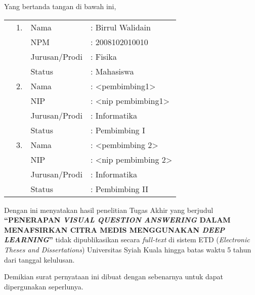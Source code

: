 \spernyataan %

\noindent
Yang bertanda tangan di bawah ini,
\vspace{-0.1cm}
\begin{table}[H]
{\renewcommand{\arraystretch}{0.7}
\begin{tabular}{M{0.6cm}lll}
	&1. 	& Nama   		&: Birrul Walidain \\
	&	& NPM       			&: 2008102010010   \\
	&	& Jurusan/Prodi   		&: Fisika \\
	&	& Status 				&: Mahasiswa \\  
	&2. 	& Nama  		&: <pembimbing1> \\
	&	& NIP       			&: <nip pembimbing1>   \\
	&	& Jurusan/Prodi   		&: Informatika \\
	&	& Status 				&: Pembimbing I \\  
	&3. 	& Nama  		&: <pembimbing 2> \\
	&	& NIP       			&: <nip pembimbing 2>   \\
	&	& Jurusan/Prodi   		&: Informatika \\
	&	& Status 				&: Pembimbing II   
\end{tabular}
}
\end{table}
\vspace{-0.4cm}
\noindent
Dengan ini menyatakan hasil penelitian Tugas Akhir yang berjudul \textbf{“PENERAPAN \textit{VISUAL QUESTION ANSWERING} DALAM MENAFSIRKAN CITRA MEDIS MENGGUNAKAN \textit{DEEP LEARNING}”} tidak dipublikasikan secara \textit{full-text} di sistem ETD (\textit{Electronic Theses and Dissertations}) Universitas Syiah Kuala hingga batas waktu 5 tahun dari tanggal kelulusan.

\vspace{0.4cm}
\noindent
Demikian surat pernyataan ini dibuat dengan sebenarnya untuk dapat dipergunakan seperlunya.

